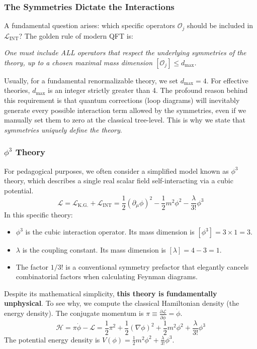 \subsubsection*{The Symmetries Dictate the Interactions}
A fundamental question arises: which specific operators \(\mathcal{O}_j\) should be included in \(\mathcal{L}_{\text{INT}}\)? The golden rule of modern QFT is:
\begin{center}
    \textit{One must include ALL operators that respect the underlying symmetries of the theory, up to a chosen maximal mass dimension \([\mathcal{O}_j] \leq d_{\text{max}}\).}
\end{center}
Usually, for a fundamental renormalizable theory, we set \(d_{\text{max}} = 4\). For effective theories, \(d_{\text{max}}\) is an integer strictly greater than 4. The profound reason behind this requirement is that quantum corrections (loop diagrams) will inevitably generate every possible interaction term allowed by the symmetries, even if we manually set them to zero at the classical tree-level. This is why we state that \textit{symmetries uniquely define the theory}.

\subsubsection{\(\phi^3\) Theory}

For pedagogical purposes, we often consider a simplified model known as \(\phi^3\) theory, which describes a single real scalar field self-interacting via a cubic potential.
\[
    \mathcal{L} = \mathcal{L}_{\text{K.G.}} + \mathcal{L}_{\text{INT}} = \frac{1}{2}(\partial_\mu \phi)^2 - \frac{1}{2}m^2\phi^2 - \frac{\lambda}{3!}\phi^3
\]
In this specific theory:
\begin{itemize}
    \item \(\phi^3\) is the cubic interaction operator. Its mass dimension is \([\phi^3] = 3 \times 1 = 3\).
    \item \(\lambda\) is the coupling constant. Its mass dimension is \([\lambda] = 4 - 3 = 1\).
    \item The factor \(1/3!\) is a conventional symmetry prefactor that elegantly cancels combinatorial factors when calculating Feynman diagrams.
\end{itemize}

Despite its mathematical simplicity, \textbf{this theory is fundamentally unphysical}. To see why, we compute the classical Hamiltonian density (the energy density). The conjugate momentum is \(\pi \equiv \frac{\partial \mathcal{L}}{\partial \dot{\phi}} = \dot{\phi}\).
\[
    \mathcal{H} = \pi \dot{\phi} - \mathcal{L} = \frac{1}{2}\pi^2 + \frac{1}{2}(\nabla \phi)^2 + \frac{1}{2}m^2\phi^2 + \frac{\lambda}{3!}\phi^3
\]
The potential energy density is \(V(\phi) = \frac{1}{2}m^2\phi^2 + \frac{\lambda}{3!}\phi^3\).

